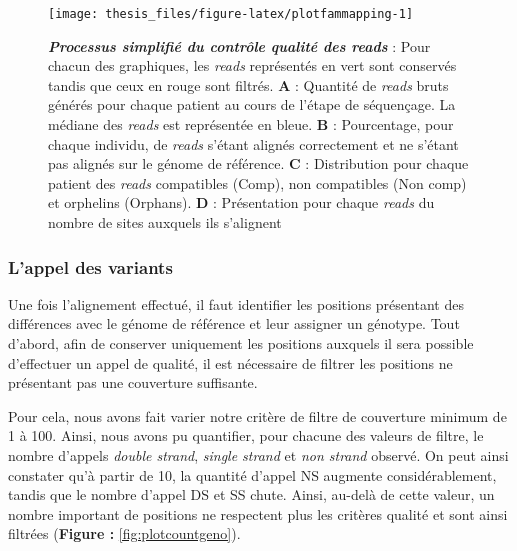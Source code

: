\documentclass[12pt,a4paper,twoside]{ugathesis}
\theoremstyle{definition}
\theoremstyle{definition}
\theoremstyle{definition}
\theoremstyle{remark}
\begin{document}
\begin{figure}

{\centering \texttt{[image: thesis\_files/figure-latex/plotfammapping-1]} 

}

\caption[Processus simplifié du contrôle qualité des
\emph{reads}\\]{\textbf{\emph{Processus simplifié du contrôle
qualité des \emph{reads}}} : Pour chacun des graphiques, les
\emph{reads} représentés en vert sont conservés tandis que ceux en rouge
sont filtrés. \textbf{A} : Quantité de \emph{reads} bruts générés pour
chaque patient au cours de l'étape de séquençage. La médiane des
\emph{reads} est représentée en bleue. \textbf{B} : Pourcentage, pour
chaque individu, de \emph{reads} s'étant alignés correctement et ne
s'étant pas alignés sur le génome de référence. \textbf{C} :
Distribution pour chaque patient des \emph{reads} compatibles (Comp),
non compatibles (Non comp) et orphelins (Orphans). \textbf{D} :
Présentation pour chaque \emph{reads} du nombre de sites auxquels ils
s'alignent}\label{fig:plotfammapping}
\end{figure}
















\newpage

\subsubsection{L'appel des variants}\label{lappel-des-variants-1}

Une fois l'alignement effectué, il faut identifier les positions
présentant des différences avec le génome de référence et leur assigner
un génotype. Tout d'abord, afin de conserver uniquement les positions
auxquels il sera possible d'effectuer un appel de qualité, il est
nécessaire de filtrer les positions ne présentant pas une couverture
suffisante.

Pour cela, nous avons fait varier notre critère de filtre de couverture
minimum de 1 à 100. Ainsi, nous avons pu quantifier, pour chacune des
valeurs de filtre, le nombre d'appels \emph{double strand}, \emph{single
strand} et \emph{non strand} observé. On peut ainsi constater qu'à
partir de 10, la quantité d'appel NS augmente considérablement, tandis
que le nombre d'appel DS et SS chute. Ainsi, au-delà de cette valeur, un
nombre important de positions ne respectent plus les critères qualité et
sont ainsi filtrées (\textbf{Figure : }\ref{fig:plotcountgeno}).\\
\end{document}
